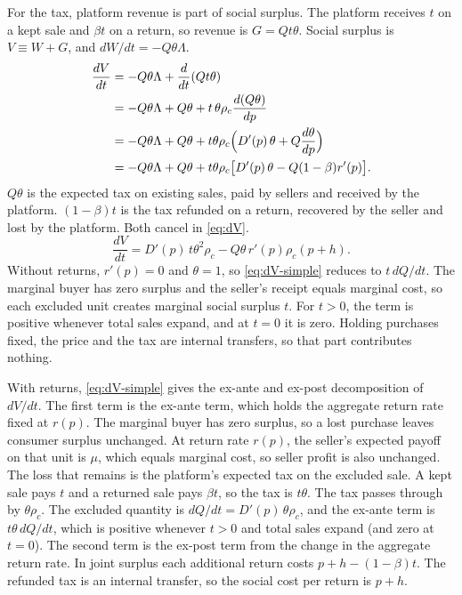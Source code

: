 \documentclass[11pt]{article}
\begin{document}
For the tax, platform revenue is part of social surplus. The platform
receives $t$ on a kept sale and $\beta t$ on a return, so revenue is
$G=Qt\theta$. Social surplus is $V\equiv W+G$, and $dW/dt=-Q\theta\Lambda$.
\begin{align}
  \frac{dV}{dt}
  &=
  -Q\theta\Lambda+\frac{d}{dt}(Qt\theta)
  \notag\\
  &=
  -Q\theta\Lambda+Q\theta+t\,\theta\rho_c\frac{d(Q\theta)}{dp}
  \notag\\
  &=
  -Q\theta\Lambda+Q\theta
  +t\theta\rho_c\Bigl(
    D'(p)\,\theta+Q\frac{d\theta}{dp}
  \Bigr)
  \notag\\
  &=
  -Q\theta\Lambda+Q\theta
  +t\theta\rho_c\bigl[D'(p)\,\theta-Q(1-\beta)r'(p)\bigr].
  \label{eq:dV}
\end{align}
$Q\theta$ is the expected tax on existing sales, paid by sellers and received by the platform. $(1-\beta)t$ is the tax refunded on a return, recovered by the seller and lost by the platform. Both cancel in \eqref{eq:dV}.
\begin{equation}
  \frac{dV}{dt}
  =
  D'(p)\,t\theta^{2}\rho_c
  -Q\theta\,r'(p)\rho_c(p+h).
  \label{eq:dV-simple}
\end{equation}
Without returns, $r'(p)=0$ and $\theta=1$, so \eqref{eq:dV-simple} reduces to $t\,dQ/dt$. The marginal buyer has zero surplus and the seller's receipt equals marginal cost, so each excluded unit creates marginal social surplus $t$. For $t>0$, the term is positive whenever total sales expand, and at $t=0$ it is zero. Holding purchases fixed, the price and the tax are internal transfers, so that part contributes nothing.

With returns, \eqref{eq:dV-simple} gives the ex-ante and ex-post decomposition of $dV/dt$. The first term is the ex-ante term, which holds the aggregate return rate fixed at $r(p)$. The marginal buyer has zero surplus, so a lost purchase leaves consumer surplus unchanged. At return rate $r(p)$, the seller's expected payoff on that unit is $\mu$, which equals marginal cost, so seller profit is also unchanged. The loss that remains is the platform's expected tax on the excluded sale. A kept sale pays $t$ and a returned sale pays $\beta t$, so the tax is $t\theta$. The tax passes through by $\theta\rho_c$. The excluded quantity is $dQ/dt=D'(p)\,\theta\rho_c$, and the ex-ante term is $t\theta\,dQ/dt$, which is positive whenever $t>0$ and total sales expand (and zero at $t=0$). The second term is the ex-post term from the change in the aggregate return rate. In joint surplus each additional return costs $p+h-(1-\beta)t$. The refunded tax is an internal transfer, so the social cost per return is $p+h$.
\end{document}

